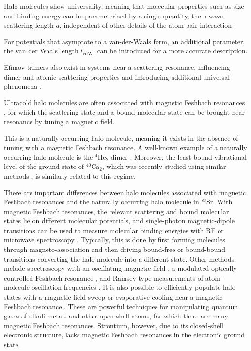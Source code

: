 Halo molecules show universality, meaning that molecular properties such as size and binding energy can be parameterized by a single quantity, the $s$-wave scattering length $a$, independent of other details of the atom-pair interaction \cite{kgj06,bha06}. 

For potentials that asymptote to a van-der-Waals form, an additional parameter, the van der Waals length $l_{\mathrm{vdW}}$, can be introduced for a more accurate description. 

Efimov trimers also exist in systems near a scattering resonance, influencing dimer and atomic scattering properties and introducing additional universal phenomena \cite{bha07,nen17}. 

Ultracold halo molecules are often associated with magnetic Feshbach resonances \cite{cgj10}, for which the scattering state and a bound molecular state can be brought near resonance by tuning a magnetic field.

This is a naturally occurring halo molecule, meaning it exists in the absence of tuning with a magnetic Feshbach resonance. 
A well-known example of a naturally occurring halo molecule is the $^4$He$_2$ dimer \cite{lmk93,sto94,kgj06}.
Moreover, the least-bound vibrational level of the ground state of $^{40}$Ca$_2$, which was recently studied using similar methods \cite{Pachomow2017a}, is similarly related to this regime.

There are important differences between halo molecules associated with magnetic Feshbach resonances and the naturally occurring halo molecule in $^{86}$Sr. 
With magnetic Feshbach resonances, the relevant scattering and bound molecular states lie on different molecular potentials, and single-photon magnetic-dipole transitions can be used to measure molecular binding energies with RF or microwave spectroscopy \cite{cgj10,cju05,thw05b}. 
Typically, this is done by first forming molecules through magneto-association and then driving bound-free or bound-bound transitions converting the halo molecule into a different state.
Other methods include spectroscopy with an oscillating magnetic field \cite{thw05b}, a modulated optically controlled Feshbach resonance \cite{chx15}, and Ramsey-type measurements of atom-molecule oscillation frequencies \cite{ckt03}. 
It is also possible to efficiently populate halo states with a magnetic-field sweep \cite{grj03} or evaporative cooling \cite{jba03} near a magnetic Feshbach resonance \cite{cgj10}. 
These are powerful techniques for manipulating quantum gases of alkali metals and other open-shell atoms, for which there are many magnetic Feshbach resonances. 
Strontium, however, due to its closed-shell electronic structure, lacks magnetic Feshbach resonances in the electronic ground state.



